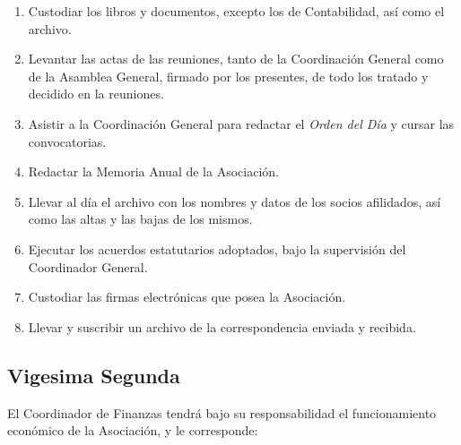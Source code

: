         \begin{enumerate}
          
          \item
            Custodiar los libros y documentos, excepto los de Contabilidad,
            as\'i{} como el archivo.

          \item
            Levantar las actas de las reuniones, tanto de la Coordinaci\'on
            General como de la Asamblea General, firmado por los presentes, de
            todo los tratado y decidido en la reuniones.

          \item
            Asistir a la Coordinaci\'on General para redactar el \emph{Orden del
            D\'i{}a} y cursar las convocatorias.

          \item
            Redactar la Memoria Anual de la Asociaci\'on.

          \item
            Llevar al d\'i{}a el archivo con los nombres y datos de los socios
            afilidados, as\'i{} como las altas y las bajas de los mismos.

          \item
            Ejecutar los acuerdos estatutarios adoptados, bajo la supervisi\'on
            del Coordinador General.

          \item
            Custodiar las firmas electr\'onicas que posea la Asociaci\'on.

          \item
            Llevar y suscribir un archivo de la correspondencia enviada y
            recibida.

        \end{enumerate}

    \subsection{Vigesima Segunda}
      El Coordinador de Finanzas tendr\'a bajo su responsabilidad el
      funcionamiento econ\'omico de la Asociaci\'on, y le corresponde:
      
